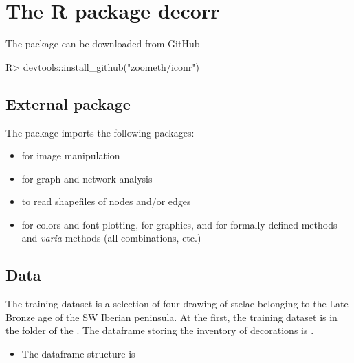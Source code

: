 \documentclass[article]{jss}\usepackage[]{graphicx}\usepackage[]{color}
\begin{document}
\section{The R package decorr} \label{sec:models}

The  package can be downloaded from GitHub
%
\begin{CodeChunk}
\begin{CodeInput}
R>   devtools::install_github("zoometh/iconr")
\end{CodeInput}
\end{CodeChunk}
%

\subsection{External package} \label{sec:ext_pck}

The  package imports the following packages:
\begin{itemize}
\setlength\itemsep{.1em}
  \item {} for image manipulation \citep{Ooms18}
  \item {} for graph and network analysis \citep{Csardi06} 
  \item {}  to read shapefiles of nodes and/or edges \citep{Bivand19}
  \item {} for colors and font plotting,  for graphics,  and  for formally defined methods and \emph{varia} methods (all combinations, etc.) \citep{R19}
\end{itemize}

\subsection{Data} \label{sec:ext_data}

The training dataset is a selection of four drawing of stelae belonging to the Late Bronze age of the SW Iberian peninsula. At the first, the training dataset is in the  folder of the . The dataframe storing the inventory of decorations is .

\begin{itemize}
\item The  dataframe structure is
\end{itemize}
\end{document}
